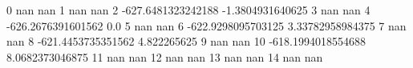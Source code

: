 0 nan nan
1 nan nan
2 -627.6481323242188 -1.3804931640625
3 nan nan
4 -626.2676391601562 0.0
5 nan nan
6 -622.9298095703125 3.33782958984375
7 nan nan
8 -621.4453735351562 4.822265625
9 nan nan
10 -618.1994018554688 8.0682373046875
11 nan nan
12 nan nan
13 nan nan
14 nan nan
